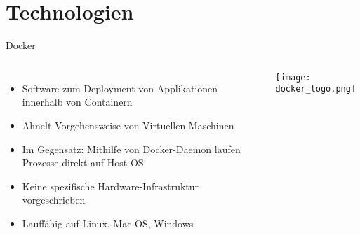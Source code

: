 \documentclass[compress]{beamer}
\begin{document}

\section{Technologien}
\begin{frame}{Docker}
  \begin{columns}[c]
  \begin{itemize}
    \item Software zum Deployment von Applikationen innerhalb von Containern
    \item Ähnelt Vorgehensweise von Virtuellen Maschinen
    \item Im Gegensatz: Mithilfe von Docker-\break Daemon laufen Prozesse direkt auf Host-OS
    \item Keine spezifische Hardware-\break Infrastruktur vorgeschrieben
    \item Lauffähig auf Linux, Mac-OS, Windows
  \end{itemize}
    \texttt{[image: docker\_logo.png]}
  \end{columns}
\end{frame}
\end{document}
